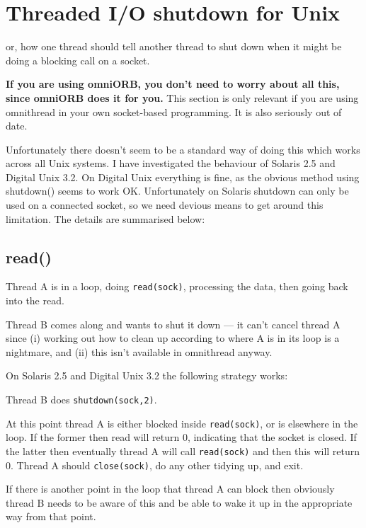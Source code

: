 \documentclass[11pt,twoside,a4paper]{article}
\begin{document}
\section{Threaded I/O shutdown for Unix}

or, how one thread should tell another thread to shut down when it
might be doing a blocking call on a socket.

\textbf{If you are using omniORB, you don't need to worry about all
this, since omniORB does it for you.}  This section is only relevant
if you are using omnithread in your own socket-based programming. It
is also seriously out of date.

Unfortunately there doesn't seem to be a standard way of doing this
which works across all Unix systems.  I have investigated the
behaviour of Solaris 2.5 and Digital Unix 3.2.  On Digital Unix
everything is fine, as the obvious method using shutdown() seems to
work OK.  Unfortunately on Solaris shutdown can only be used on a
connected socket, so we need devious means to get around this
limitation.  The details are summarised below:


\subsection{read()}

Thread A is in a loop, doing \verb|read(sock)|, processing the data,
then going back into the read.

Thread B comes along and wants to shut it down --- it can't cancel
thread A since (i) working out how to clean up according to where A is
in its loop is a nightmare, and (ii) this isn't available in
omnithread anyway.

On Solaris 2.5 and Digital Unix 3.2 the following strategy works:

Thread B does \verb|shutdown(sock,2)|.

At this point thread A is either blocked inside \verb|read(sock)|, or
is elsewhere in the loop.  If the former then read will return 0,
indicating that the socket is closed.  If the latter then eventually
thread A will call \verb|read(sock)| and then this will return 0.
Thread A should \verb|close(sock)|, do any other tidying up, and exit.

If there is another point in the loop that thread A can block then
obviously thread B needs to be aware of this and be able to wake it up
in the appropriate way from that point.
\end{document}
